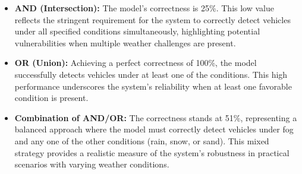 \begin{itemize}
    \item \textbf{AND (Intersection):} The model's correctness is 25\%. This low value reflects the stringent requirement for the system to correctly detect vehicles under all specified conditions simultaneously, highlighting potential vulnerabilities when multiple weather challenges are present.
    \item \textbf{OR (Union):} Achieving a perfect correctness of 100\%, the model successfully detects vehicles under at least one of the conditions. This high performance underscores the system's reliability when at least one favorable condition is present.
    \item \textbf{Combination of AND/OR:} The correctness stands at 51\%, representing a balanced approach where the model must correctly detect vehicles under fog and any one of the other conditions (rain, snow, or sand). This mixed strategy provides a realistic measure of the system's robustness in practical scenarios with varying weather conditions.
\end{itemize}



\newpage

